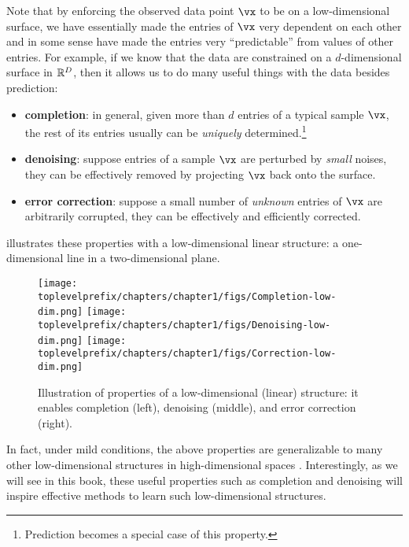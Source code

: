 \documentclass[../../book-main.tex]{subfiles}
\begin{document}
Note that by enforcing the observed data point $\vx$ to be on a low-dimensional surface, we have essentially made the entries of $\vx$ very dependent on each other and in some sense have made the entries very ``predictable'' from values of other entries. For example, if we know that the data are constrained on a $d$-dimensional surface in $\mathbb{R}^D$, then it allows us to do many useful things with the data besides prediction: %
\begin{itemize}
    \item \textbf{completion}: in general, given more than $d$ entries of a typical sample $\vx$, the rest of its entries usually can be {\em uniquely} determined.\footnote{Prediction becomes a special case of this property.} 
    \item \textbf{denoising}: suppose entries of a sample $\vx$ are perturbed by {\em small} noises, they can be effectively removed by projecting $\vx$ back onto the surface.
    \item \textbf{error correction}: suppose a small number of {\em unknown} entries of $\vx$ are arbitrarily corrupted, they can be effectively and efficiently corrected. 
\end{itemize}
 illustrates these properties with a low-dimensional linear structure: a one-dimensional line in a two-dimensional plane. 

\begin{figure}
    \centering
    \texttt{[image: \\toplevelprefix/chapters/chapter1/figs/Completion-low-dim.png]}     \texttt{[image: \\toplevelprefix/chapters/chapter1/figs/Denoising-low-dim.png]} \texttt{[image: \\toplevelprefix/chapters/chapter1/figs/Correction-low-dim.png]} 
    \caption{Illustration of properties of a low-dimensional (linear) structure: it enables completion (left), denoising (middle), and error correction (right).}
    \label{fig:low-dim-properties}
\end{figure}

In fact, under mild conditions, the above properties are generalizable to many other low-dimensional structures in high-dimensional spaces \cite{Wright-Ma-2022}. Interestingly, as we will see in this book, these useful properties such as completion and denoising will inspire effective methods to learn such low-dimensional structures. 
\end{document}
